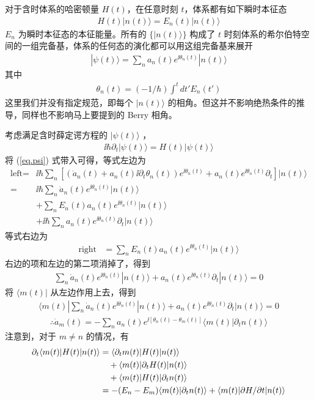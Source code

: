 对于含时体系的哈密顿量 $H(t)$，在任意时刻 $t$，体系都有如下瞬时本征态
\begin{align}
H(t)|n(t)\rangle=E_n(t)|n(t)\rangle
\end{align}
$E_n$ 为瞬时本征态的本征能量。所有的 $\{|n(t)\rangle\}$ 构成了 $t$ 时刻体系的希尔伯特空间的一组完备基，体系的任何态的演化都可以用这组完备基来展开
\begin{align}\label{eq.psi}
|\psi(t)\rangle=\sum_na_n(t)e^{\ii\theta_n(t)}|n(t)\rangle
\end{align}
其中
\begin{align}
\theta_n(t)=(-1/\hbar)\int^tdt'E_n(t')
\end{align}
这里我们并没有指定规范，即每个 $|n(t)\rangle$ 的相角。但这并不影响绝热条件的推导，同样也不影响马上要提到的 Berry 相角。

考虑满足含时薛定谔方程的 $|\psi(t)\rangle$ ，
\begin{align}
\ii\hbar\partial_t|\psi(t)\rangle=H(t)|\psi(t)\rangle
\end{align}
将 (\ref{eq.psi}) 式带入可得，等式左边为
\begin{align}
\text{left} 
=& \ii\hbar\sum_n[(\dot{a}_n(t)+a_n(t)\ii\partial_t\theta_n(t))e^{\ii\theta_n(t)}+a_n(t)e^{\ii\theta_n(t)}\partial_t]|n(t)\rangle\\
=& \ii\hbar\sum_n\dot{a}_n(t)e^{\ii\theta_n(t)}|n(t)\rangle\\
    & +\sum_{n}E_n(t)a_n(t)e^{\ii\theta_n(t)}|n(t)\rangle\\
    & +\ii\hbar\sum_na_{n}(t)e^{\ii\theta_n(t)}\partial_t|n(t)\rangle
\end{align}
等式右边为
\begin{align}
\text{right} &= \sum_{n}E_n(t)a_n(t)e^{\ii\theta_n(t)}|n(t)\rangle
\end{align}
右边的项和左边的第二项消掉了，得到
\begin{align}
\sum_n\dot{a}_n(t)e^{\ii\theta_n(t)}|n(t)\rangle+a_{n}(t)e^{\ii\theta_n(t)}\partial_t|n(t)\rangle=0
\end{align}
将 $\langle m(t)|$ 从左边作用上去，得到
\begin{align}
\langle m(t)|\sum_n\dot{a}_n(t)e^{\ii\theta_n(t)}|n(t)\rangle+a_{n}(t)e^{\ii\theta_n(t)}\partial_t|n(t)\rangle=0
\end{align}
\begin{align}
\therefore \dot{a}_m(t)=-\sum_na_{n}(t)e^{\ii[\theta_n(t)-\theta_m(t)]}\langle m(t)|\partial_tn(t)\rangle
\end{align}
注意到，对于 $m\neq n$ 的情况，有
\begin{align}
\partial_t\langle m(t)|H(t)|n(t)\rangle
    &= \langle\partial_tm(t)|H(t)|n(t)\rangle \notag \\
    & \quad +\langle m(t)|\partial_tH(t)|n(t)\rangle \notag \\
    & \quad +\langle m(t)|H(t)|\partial_tn(t)\rangle\\
    &= -(E_n-E_m)\langle m(t)|\partial_tn(t)\rangle+\langle m(t)|\partial H/\partial t|n(t)\rangle
\end{align}
